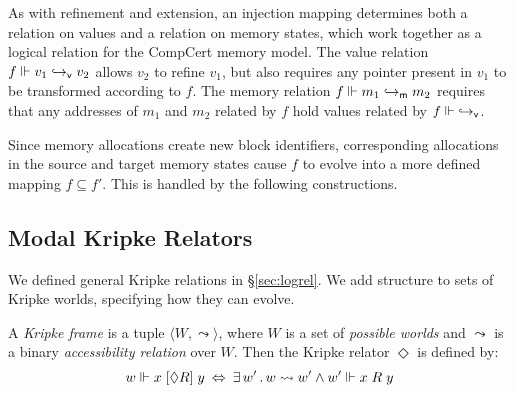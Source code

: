 \documentclass[sigplan,screen]{acmart}
\begin{document}
As with refinement and extension,
an injection mapping determines both
a relation on values and
a relation on memory states,
which work together
as a logical relation for the CompCert memory model.
The value relation $f \Vdash v_1 \hookrightarrow_{ \mathsf{v} } v_2$
allows $v_2$ to refine $v_1$,
but also requires any pointer present in $v_1$
to be transformed according to $f$.
The memory relation $f \Vdash m_1 \hookrightarrow_{ \mathsf{m} } m_2$
requires that any addresses of $m_1$ and $m_2$ related by $f$
hold values related by $f \Vdash {\hookrightarrow_{\ensuremath{ \mathsf{v} }}}$.

Since memory allocations create new block identifiers,
corresponding allocations
in the source and target memory states cause $f$ to
evolve into a more defined mapping $f \subseteq f'$.
This is handled by the following constructions.


\subsection{Modal Kripke Relators} %

We defined general Kripke relations in \S\ref{sec:logrel}.
We add structure to sets of Kripke worlds,
specifying how they can evolve.

\begin{definition} %
A \emph{Kripke frame} is a tuple
$\langle W, {\leadsto} \rangle$, where
$W$ is a set of \emph{possible worlds} and
$\leadsto$ is a
binary \emph{accessibility relation} over $W$.
Then the Kripke relator $\Diamond$ is defined by:
\[
  w \Vdash x \mathrel{[{\Diamond R}]} y \: \Leftrightarrow \:
    \exists \, w' \,.\, w \leadsto w' \wedge
      w' \Vdash x \mathrel{R} y
\]
\end{definition}
\end{document}
